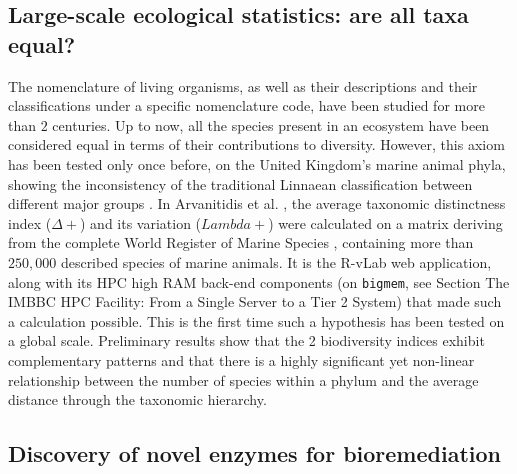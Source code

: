    \subsection*{Large-scale ecological statistics: are all taxa equal?}

   The nomenclature of living organisms, as well as their descriptions and their classifications under a specific nomenclature code, have been studied for more than $2$ centuries. 
   Up to now, all the species present in an ecosystem have been considered equal in terms of their contributions to diversity. 
   However, this axiom has been tested only once before, on the United Kingdom's marine animal phyla, showing the inconsistency of the traditional Linnaean classification between different major groups \citep{warwick2008all}. 
   In Arvanitidis et al. \citep{arvanitidis2018research}, the average taxonomic distinctness index 
   ($\Delta+$) and its variation ($Lambda+$) were calculated on a matrix deriving from the complete World Register of Marine Species \citep{vandepitte2018decade}, containing more than $250,000$ described species of marine animals. 
   It is the R-vLab web application, along with its HPC high RAM back-end components (on \texttt{bigmem}, see Section The IMBBC HPC Facility: 
   From a Single Server to a Tier 2 System) that made such a calculation possible. This is the first time such a hypothesis has been tested on a global scale. 
   Preliminary results show that the 2 biodiversity indices exhibit complementary patterns and that there is a highly significant yet non-linear relationship between the number of species within a phylum and the average distance through the taxonomic hierarchy.

   \subsection*{Discovery of novel enzymes for bioremediation}

